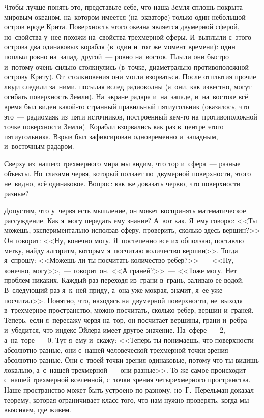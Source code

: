 Чтобы лучше понять это, представьте себе, что наша Земля сплошь покрыта мировым океаном, на~котором
имеется (на~экваторе) только один небольшой остров вроде Крита. Поверхность этого океана является
двумерной сферой, но~свойства у~нее похожи на~свойства трехмерной сферы. И~выплыли с~этого острова
два одинаковых корабля (в~один и~тот же момент времени): один поплыл ровно на~запад, другой~---
ровно на~восток. Плыли они быстро и~потому очень сильно столкнулись (в~точке, диаметрально
противоположной острову Криту). От~столкновения они могли взорваться. После отплытия прочие люди
следили за~ними, посылая вслед радиоволны (а~они, как известно, могут огибать поверхность Земли).
На~экране радара и~на~западе, и~на~востоке всё время был виден какой-то странный правильный
пятиугольник (оказалось, что это~--- радиомаяк из~пяти источников, построенный кем-то
на~противоположной точке поверхности Земли). Корабли взорвались как раз в~центре этого
пятиугольника. Взрыв был зафиксирован одновременно и~западным, и~восточным радаром.

\smallskip

\hrulefill

\medskip

Сверху из~нашего трехмерного мира мы видим, что тор и~сфера~--- разные объекты. Но~глазами червя,
который ползает по~двумерной поверхности, этого не~видно, всё одинаковое. Вопрос: как же доказать
червю, что поверхности разные?

Допустим, что у~червя есть мышление, он может воспринять математическое рассуждение. Как я~могу
передать ему знание? А~вот как. Я~ему говорю: <<Ты можешь, экспериментально исползав сферу,
проверить, сколько здесь вершин?>> Он говорит: <<Ну, конечно могу. Я~постепенно все их обползаю,
поставлю метку, найду алгоритм, которым я~посчитаю количество вершин>>. Тогда я~спрошу: <<Можешь ли
ты посчитать количество ребер?>>~--- <<Ну, конечно, могу>>,~--- говорит он. <<А граней?>>~--- <<Тоже
могу. Нет проблем никаких. Каждый раз переходя из~грани в~грань, заливаю ее водой. В~следующий раз
я~к~ней приду, а~она уже мокрая, значит, я~ее уже посчитал>>. Понятно, что, находясь на~двумерной
поверхности, не~выходя в~трехмерное пространство, можно посчитать, сколько ребер, вершин и~граней.
Теперь, если я~пересажу червя на~тор, он посчитает вершины, грани и~ребра и~убедится, что индекс
Эйлера имеет другое значение. На~сфере~--- 2, а~на~торе~--- 0. Тут я~ему и~скажу: <<Теперь ты
понимаешь, что поверхности абсолютно разные, они с~нашей человеческой трехмерной точки зрения
абсолютно разные. Они с~твоей точки зрения одинаковые, потому что ты видишь локально, а~с~нашей
трехмерной~--- они разные>>. То же самое происходит с~нашей трехмерной вселенной, с~точки зрения
четырехмерного пространства. Наше пространство может быть устроено по-разному, но~Г.~Перельман
доказал теорему, которая ограничивает класс того, что нам нужно проверять, когда мы выясняем, где
живем.

